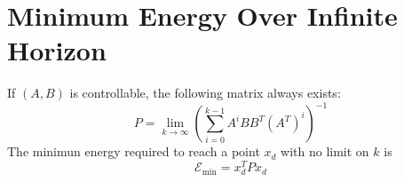 \documentclass[10pt,a4paper,oneside]{article}
\begin{document}
\section{Minimum Energy Over Infinite Horizon}
If $(A, B)$ is controllable, the following matrix always exists:
\[
P=\lim _{k \rightarrow \infty}\left(\sum_{i=0}^{k-1} A^{i} B B^{T}\left(A^{T}\right)^{i}\right)^{-1}
\]
The minimun energy required to reach a point $x_d$ with no limit on $k$ is
\[
\mathcal{E}_{\min }=x_{d}^{T} P x_{d}
\]
\end{document}

